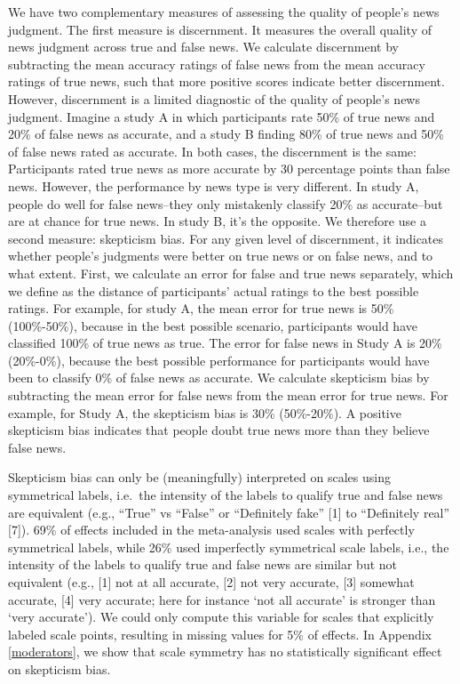 \documentclass[
  man]{apa6}
\begin{document}
We have two complementary measures of assessing the quality of people's news judgment. The first measure is discernment. It measures the overall quality of news judgment across true and false news. We calculate discernment by subtracting the mean accuracy ratings of false news from the mean accuracy ratings of true news, such that more positive scores indicate better discernment. However, discernment is a limited diagnostic of the quality of people's news judgment. Imagine a study A in which participants rate 50\% of true news and 20\% of false news as accurate, and a study B finding 80\% of true news and 50\% of false news rated as accurate. In both cases, the discernment is the same: Participants rated true news as more accurate by 30 percentage points than false news. However, the performance by news type is very different. In study A, people do well for false news--they only mistakenly classify 20\% as accurate--but are at chance for true news. In study B, it's the opposite. We therefore use a second measure: skepticism bias. For any given level of discernment, it indicates whether people's judgments were better on true news or on false news, and to what extent. First, we calculate an error for false and true news separately, which we define as the distance of participants' actual ratings to the best possible ratings. For example, for study A, the mean error for true news is 50\% (100\%-50\%), because in the best possible scenario, participants would have classified 100\% of true news as true. The error for false news in Study A is 20\% (20\%-0\%), because the best possible performance for participants would have been to classify 0\% of false news as accurate. We calculate skepticism bias by subtracting the mean error for false news from the mean error for true news. For example, for Study A, the skepticism bias is 30\% (50\%-20\%). A positive skepticism bias indicates that people doubt true news more than they believe false news.

Skepticism bias can only be (meaningfully) interpreted on scales using symmetrical labels, i.e.~the intensity of the labels to qualify true and false news are equivalent (e.g., ``True'' vs ``False'' or ``Definitely fake'' {[}1{]} to ``Definitely real'' {[}7{]}). 69\% of effects included in the meta-analysis used scales with perfectly symmetrical labels, while 26\% used imperfectly symmetrical scale labels, i.e., the intensity of the labels to qualify true and false news are similar but not equivalent (e.g., {[}1{]} not at all accurate, {[}2{]} not very accurate, {[}3{]} somewhat accurate, {[}4{]} very accurate; here for instance `not all accurate' is stronger than `very accurate'). We could only compute this variable for scales that explicitly labeled scale points, resulting in missing values for 5\% of effects. In Appendix \ref{moderators}, we show that scale symmetry has no statistically significant effect on skepticism bias.
\end{document}

